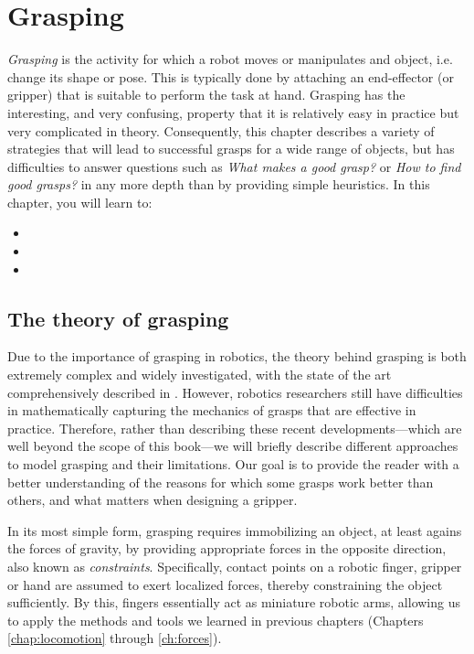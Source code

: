 \chapter{Grasping}\label{chap:grasping}

\textsl{Grasping} is the activity for which a robot moves or manipulates and object, i.e. change its shape or pose. This is typically done by attaching an end-effector (or gripper) that is suitable to perform the task at hand.
Grasping has the interesting, and very confusing, property that it is relatively easy in practice but very complicated in theory. Consequently, this chapter describes a variety of strategies that will lead to successful grasps for a wide range of objects, but has difficulties to answer questions such as \textsl{What makes a good grasp?} or \textsl{How to find good grasps?} in any more depth than by providing simple heuristics.
In this chapter, you will learn to:
\begin{itemize}
\item {}
\item {}
\item {}
\end{itemize}

\section{The theory of grasping}

Due to the importance of grasping in robotics, the theory behind grasping is both extremely complex and widely investigated, with the state of the art comprehensively described in \cite{rimon2019mechanics}. However, robotics researchers still have difficulties in mathematically capturing the mechanics of grasps that are effective in practice. Therefore, rather than describing these recent developments---which are well beyond the scope of this book---we will briefly describe different approaches to model grasping and their limitations. Our goal is to provide the reader with a better understanding of the reasons for which some grasps work better than others, and what matters when designing a gripper.

In its most simple form, grasping requires immobilizing an object, at least agains the forces of gravity, by providing appropriate forces in the opposite direction, also known as \textsl{constraints}. Specifically, contact points on a robotic finger, gripper or hand are assumed to exert localized forces, thereby constraining the object sufficiently. By this, fingers essentially act as miniature robotic arms, allowing us to apply the methods and tools we learned in previous chapters (Chapters \ref{chap:locomotion} through \ref{ch:forces}).

